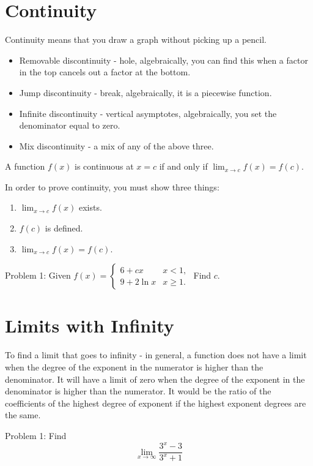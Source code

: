 \documentclass[../abcalc.tex]{subfiles}
\begin{document}
\section{Continuity}
Continuity means that you draw a graph without picking up a pencil.

\begin{itemize}
    \item Removable discontinuity - hole, algebraically, you can find this when a factor in the top cancels out a factor at the bottom.
    \item Jump discontinuity - break, algebraically, it is a piecewise function.
    \item Infinite discontinuity - vertical asymptotes, algebraically, you set the denominator equal to zero.
    \item Mix discontinuity - a mix of any of the above three.
\end{itemize}

\begin{definition}
    A function $f(x)$ is continuous at $x=c$ if and only if $\lim_{x\to c}f(x) = f(c)$.
\end{definition}

In order to prove continuity, you must show three things:
\begin{enumerate}
    \item $\lim_{x\to c}f(x)$ exists.
    \item $f(c)$ is defined.
    \item $\lim_{x\to c}f(x)=f(c)$.
\end{enumerate}

Problem 1: 
Given \( f(x) = 
\begin{cases}
    6+cx & x < 1, \\
    9+2\ln x & x \geq 1.
\end{cases} \)
Find \( c \).
\section{Limits with Infinity}
To find a limit that goes to infinity - in general, a function does not have a limit when the degree of the exponent in the numerator is 
higher than the denominator. It will have a limit of zero when the degree of the exponent in the denominator is higher than the numerator.
It would be the ratio of the coefficients of the highest degree of exponent if the highest exponent degrees are the same.

Problem 1: Find 
\[\lim_{x\to \infty}\frac{3^x-3}{3^x+1}\]
\end{document}
